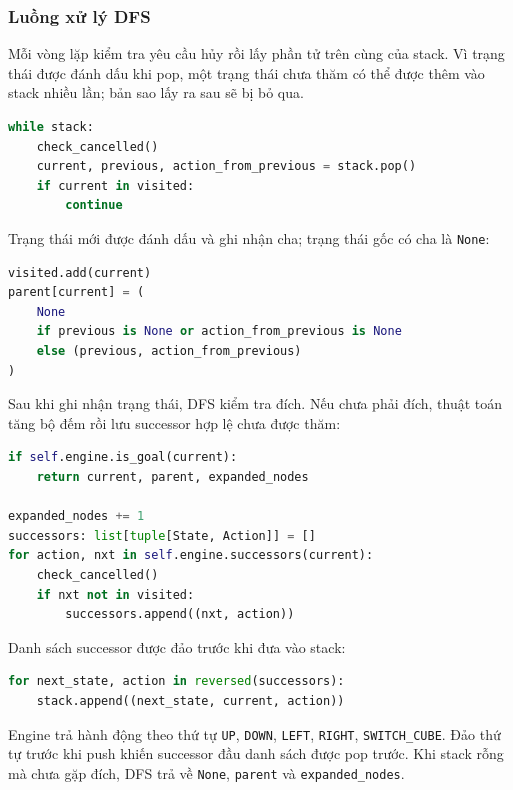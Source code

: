 \subsubsection{Luồng xử lý DFS}
Mỗi vòng lặp kiểm tra yêu cầu hủy rồi lấy phần tử trên cùng của stack. Vì trạng thái được đánh dấu khi pop, một trạng thái chưa thăm có thể được thêm vào stack nhiều lần; bản sao lấy ra sau sẽ bị bỏ qua.
\begin{lstlisting}[language=Python]
while stack:
    check_cancelled()
    current, previous, action_from_previous = stack.pop()
    if current in visited:
        continue
\end{lstlisting}
Trạng thái mới được đánh dấu và ghi nhận cha; trạng thái gốc có cha là \texttt{None}:
\begin{lstlisting}[language=Python]
visited.add(current)
parent[current] = (
    None
    if previous is None or action_from_previous is None
    else (previous, action_from_previous)
)
\end{lstlisting}
Sau khi ghi nhận trạng thái, DFS kiểm tra đích. Nếu chưa phải đích, thuật toán tăng bộ đếm rồi lưu successor hợp lệ chưa được thăm:
\begin{lstlisting}[language=Python]
if self.engine.is_goal(current):
    return current, parent, expanded_nodes

expanded_nodes += 1
successors: list[tuple[State, Action]] = []
for action, nxt in self.engine.successors(current):
    check_cancelled()
    if nxt not in visited:
        successors.append((nxt, action))
\end{lstlisting}
Danh sách successor được đảo trước khi đưa vào stack:
\begin{lstlisting}[language=Python]
for next_state, action in reversed(successors):
    stack.append((next_state, current, action))
\end{lstlisting}
Engine trả hành động theo thứ tự \texttt{UP}, \texttt{DOWN}, \texttt{LEFT}, \texttt{RIGHT}, \texttt{SWITCH\_CUBE}. Đảo thứ tự trước khi push khiến successor đầu danh sách được pop trước. Khi stack rỗng mà chưa gặp đích, DFS trả về \texttt{None}, \texttt{parent} và \texttt{expanded\_nodes}.

